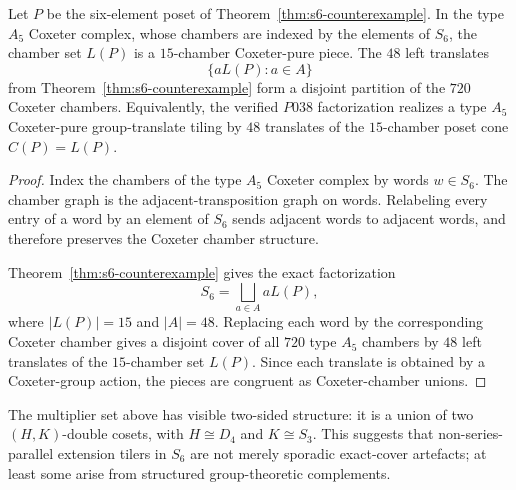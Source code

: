 \begin{corollary}
\label{cor:s6-counterexample-coxeter-realization}
Let $P$ be the six-element poset of
Theorem~\ref{thm:s6-counterexample}.  In the type $A_5$ Coxeter complex,
whose chambers are indexed by the elements of $S_6$, the chamber set
$L(P)$ is a $15$-chamber Coxeter-pure piece.  The $48$ left translates
\[
        \{aL(P): a\in A\}
\]
from Theorem~\ref{thm:s6-counterexample} form a disjoint partition of the
$720$ Coxeter chambers.  Equivalently, the verified $P038$ factorization
realizes a type $A_5$ Coxeter-pure group-translate tiling by $48$
translates of the $15$-chamber poset cone $C(P)=L(P)$.
\end{corollary}

\begin{proof}
Index the chambers of the type $A_5$ Coxeter complex by words
$w\in S_6$.  The chamber graph is the adjacent-transposition graph on
words.  Relabeling every entry of a word by an element of $S_6$ sends
adjacent words to adjacent words, and therefore preserves the Coxeter
chamber structure.

Theorem~\ref{thm:s6-counterexample} gives the exact factorization
\[
        S_6=\bigsqcup_{a\in A} aL(P),
\]
where $|L(P)|=15$ and $|A|=48$.  Replacing each word by the corresponding
Coxeter chamber gives a disjoint cover of all $720$ type $A_5$ chambers by
$48$ left translates of the $15$-chamber set $L(P)$.  Since each translate
is obtained by a Coxeter-group action, the pieces are congruent as
Coxeter-chamber unions.
\end{proof}

\begin{remark}
The multiplier set above has visible two-sided structure: it is a union of
two $(H,K)$-double cosets, with $H\cong D_4$ and $K\cong S_3$.  This
suggests that non-series-parallel extension tilers in $S_6$ are not merely
sporadic exact-cover artefacts; at least some arise from structured
group-theoretic complements.
\end{remark}
